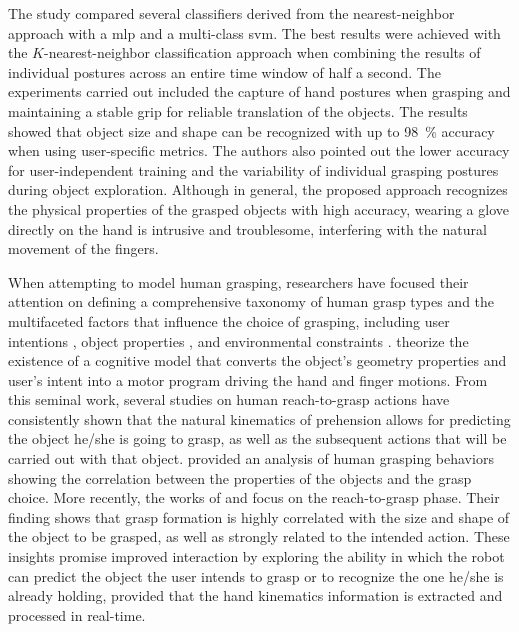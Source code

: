 The study compared several classifiers derived from the nearest-neighbor approach with a \acf{mlp} and a multi-class \acs{svm}. The best results were achieved with the $K$-nearest-neighbor classification approach when combining the results of individual postures across an entire time window of half a second. The experiments carried out included the capture of hand postures when grasping and maintaining a stable grip for reliable translation of the objects. The results showed that object size and shape can be recognized with up to \SI{98}{\percent} accuracy when using user-specific metrics. The authors also pointed out the lower accuracy for user-independent training and the variability of individual grasping postures during object exploration. Although in general, the proposed approach recognizes the physical properties of the grasped objects with high accuracy, wearing a glove directly on the hand is intrusive and troublesome, interfering with the natural movement of the fingers.

When attempting to model human grasping, researchers have focused their attention on defining a comprehensive taxonomy of human grasp types \cite{Feix2015} and the multifaceted factors that influence the choice of grasping, including user intentions \cite{Mackenzie1994}, object properties \cite{Feix2014}, and environmental constraints \cite{Puhlmann2016}. \textcite{Mackenzie1994} theorize the existence of a cognitive model that converts the object’s geometry properties and user’s intent into a motor program driving the hand and finger motions. From this seminal work, several studies on human reach-to-grasp actions have consistently shown that the natural kinematics of prehension allows for predicting the object he/she is going to grasp, as well as the subsequent actions that will be carried out with that object. \textcite{Feix2014} provided an analysis of human grasping behaviors showing the correlation between the properties of the objects and the grasp choice. More recently, the works of \textcite{Betti2018} and \textcite{Egmose2018} focus on the reach-to-grasp phase. Their finding shows that grasp formation is highly correlated with the size and shape of the object to be grasped, as well as strongly related to the intended action. These insights promise improved interaction by exploring the ability in which the robot can predict the object the user intends to grasp or to recognize the one he/she is already holding, provided that the hand kinematics information is extracted and processed in real-time.

